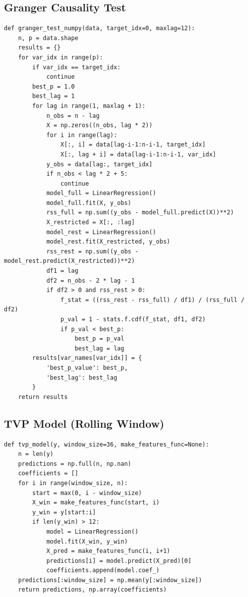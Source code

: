 \documentclass[12pt,a4paper]{article}
\begin{document}
\subsection{Granger Causality Test}
\begin{lstlisting}[caption={Granger causality test with NumPy}, label=lst:granger]
def granger_test_numpy(data, target_idx=0, maxlag=12):
    n, p = data.shape
    results = {}
    for var_idx in range(p):
        if var_idx == target_idx:
            continue
        best_p = 1.0
        best_lag = 1
        for lag in range(1, maxlag + 1):
            n_obs = n - lag
            X = np.zeros((n_obs, lag * 2))
            for i in range(lag):
                X[:, i] = data[lag-i-1:n-i-1, target_idx]
                X[:, lag + i] = data[lag-i-1:n-i-1, var_idx]
            y_obs = data[lag:, target_idx]
            if n_obs < lag * 2 + 5:
                continue
            model_full = LinearRegression()
            model_full.fit(X, y_obs)
            rss_full = np.sum((y_obs - model_full.predict(X))**2)
            X_restricted = X[:, :lag]
            model_rest = LinearRegression()
            model_rest.fit(X_restricted, y_obs)
            rss_rest = np.sum((y_obs - model_rest.predict(X_restricted))**2)
            df1 = lag
            df2 = n_obs - 2 * lag - 1
            if df2 > 0 and rss_rest > 0:
                f_stat = ((rss_rest - rss_full) / df1) / (rss_full / df2)
                p_val = 1 - stats.f.cdf(f_stat, df1, df2)
                if p_val < best_p:
                    best_p = p_val
                    best_lag = lag
        results[var_names[var_idx]] = {
            'best_p_value': best_p,
            'best_lag': best_lag
        }
    return results
\end{lstlisting}

\subsection{TVP Model (Rolling Window)}
\begin{lstlisting}[caption={TVP model with rolling window}, label=lst:tvp]
def tvp_model(y, window_size=36, make_features_func=None):
    n = len(y)
    predictions = np.full(n, np.nan)
    coefficients = []
    for i in range(window_size, n):
        start = max(0, i - window_size)
        X_win = make_features_func(start, i)
        y_win = y[start:i]
        if len(y_win) > 12:
            model = LinearRegression()
            model.fit(X_win, y_win)
            X_pred = make_features_func(i, i+1)
            predictions[i] = model.predict(X_pred)[0]
            coefficients.append(model.coef_)
    predictions[:window_size] = np.mean(y[:window_size])
    return predictions, np.array(coefficients)
\end{lstlisting}
\end{document}
